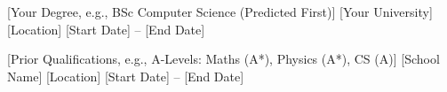 

\begin{cventries}

  \cventry
    {[Your Degree, e.g., BSc Computer Science (Predicted First)]} %
    {[Your University]} %
    {[Location]} %
    {[Start Date] -- [End Date]} %
    {}

  \cventry
    {[Prior Qualifications, e.g., A-Levels: Maths (A*), Physics (A*), CS (A)]} %
    {[School Name]} %
    {[Location]} %
    {[Start Date] -- [End Date]} %
    {}

\end{cventries}
